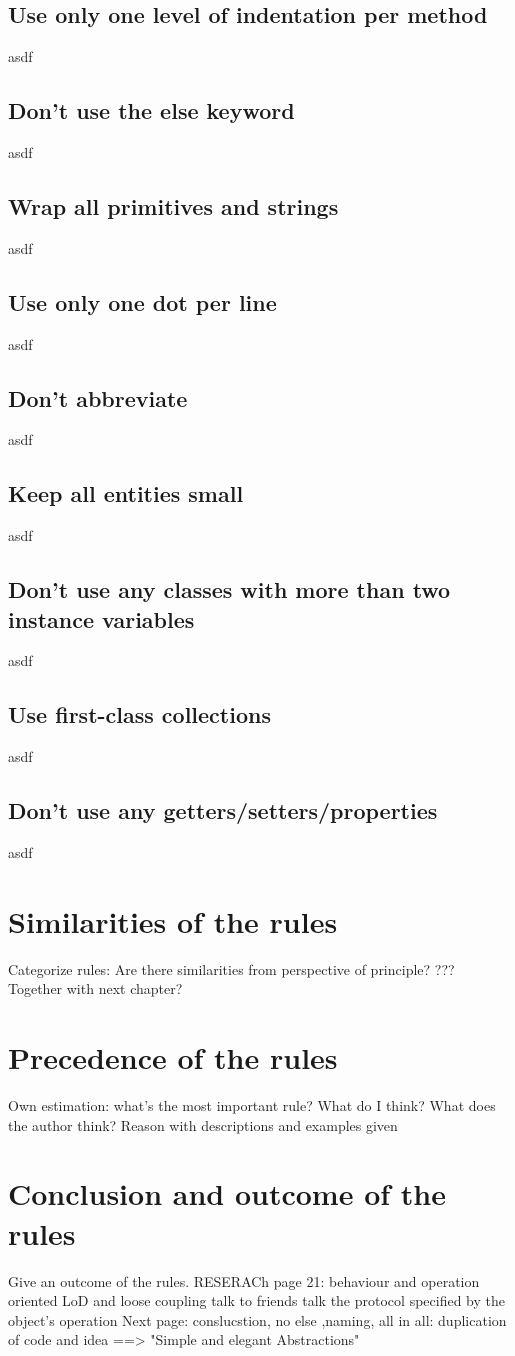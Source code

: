 \subsection{Use only one level of indentation per method}
asdf
\subsection{Don’t use the else keyword}
asdf
\subsection{Wrap all primitives and strings}
asdf
\subsection{Use only one dot per line}
asdf
\subsection{Don't abbreviate}
asdf
\subsection{Keep all entities small}
asdf
\subsection{Don't use any classes with more than two instance variables}
asdf
\subsection{Use first-class collections}
asdf
\subsection{Don’t use any getters/setters/properties}
asdf
\section{Similarities of the rules}
Categorize rules: Are there similarities from perspective of principle? ??? Together with next chapter?
\section{Precedence of the rules}
Own estimation: what's the most important rule? What do I think? What does the author think? Reason with descriptions and examples given
\section{Conclusion and outcome of the rules}
Give an outcome of the rules. RESERACh page 21: 
behaviour and operation oriented
LoD and loose coupling
talk to friends
talk the protocol specified by the object's operation
Next page: conslucstion, no else ,naming, 
all in all: duplication of code and idea
==> "Simple and elegant Abstractions"



